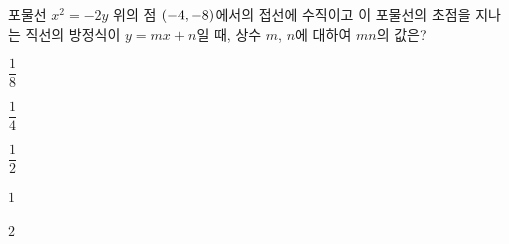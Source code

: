 포물선 $x^2=-2y$ 위의 점 $(-4{,}\mkern3mu\mathopen{}-8)$에서의 접선에 수직이고 이 포물선의 초점을 지나는 직선의 방정식이 $y=mx+n$일 때, 상수 $m$, $n$에 대하여 $mn$의 값은?
\begin{choices32}{\rule[-3ex]{0pt}{8ex}$\dfrac{1}{8}$}{\rule[-3ex]{0pt}{8ex}$\dfrac{1}{4}$}{\rule[-3ex]{0pt}{8ex}$\dfrac{1}{2}$}{\rule[-3ex]{0pt}{8ex}$1$}{\rule[-3ex]{0pt}{8ex}$2$}\end{choices32}
